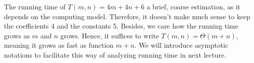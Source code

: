 The running time of $T(m,n) = 4m + 4n + 6$ a brief, coarse estimation, as it depends on the computing model.  
Therefore, it doesn't make much sense to keep the coefficients 4 and the constants 5.
Besides, we care how the running time grows as $m$ and $n$ grows.
Hence, it suffices to write $T(m,n) = \Theta(m + n)$, meaning it grows as fast as function $m + n$.
We will introduce asymptotic notations to facilitate this way of analyzing running time in next lecture.



